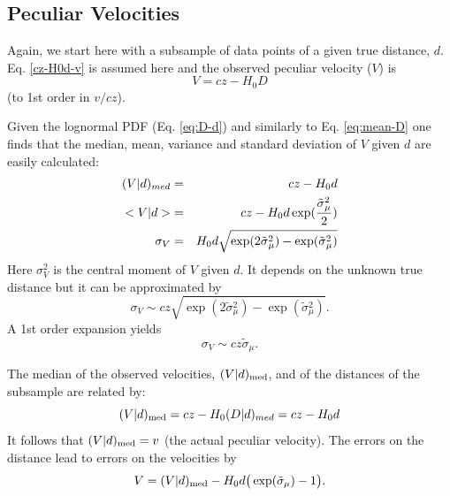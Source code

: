 \documentclass[useAMS,usenatbib]{mn2e}
\begin{document}
\subsection{  Peculiar  Velocities}%
\label{subsec:BGc-v}
 
 Again, we start here with  a  subsample of data points of  a given true distance, $d$. Eq. \ref{cz-H0d-v} is assumed here and  the   observed  peculiar  velocity ($V$) is
\begin{equation}
V =  cz -H_0 D
\label{V-cz-H0-D}
\end{equation}
(to 1st order in $v/cz$).


Given the lognormal PDF  (Eq. \ref{eq:D-d}) and similarly to Eq. \ref{eq:mean-D} one finds that the median, mean, variance and standard deviation of $V$   given $d$ are easily calculated: 
\begin{eqnarray}
(V|d)_{med} & = & cz - H_0 d  \nonumber\\
< V|d > & = &  cz - H_0 d \exp({\tilde{\sigma}{^2_\mu}\over 2} ) \\
\sigma_V & = & H_0d \sqrt{\exp(2\tilde{\sigma}{^2_\mu} )  - \exp(\tilde{\sigma}{^2_\mu}) }  \nonumber
\label{eq:mean-V}
\end{eqnarray}
Here $\sigma{^2_V}$ is the central moment of  $V$ given $d$.
It depends on the unknown true distance but  it can be approximated by
\begin{equation}
\sigma_V \sim cz\sqrt{\exp(2\tilde{\sigma}{^2_\mu} )  - \exp(\tilde{\sigma}{^2_\mu}) }.
\label{eq:mean-cz-V}
\end{equation}
A 1st order expansion yields
\begin{equation}
\sigma_V \sim  cz \tilde{\sigma}_\mu.
\label{eq:sigma-cz-V}
\end{equation}


The median of the observed velocities, $(V|d)_{\rm med}$, and of the distances of the  subsample are related by:
\begin{equation} 
(V|d)_{\rm med}=cz-H_0 (D|d)_{med}=cz-H_0 d
\label{eq:Vmed-v}
 \end{equation}
It follows that  $(V|d)_{\rm med} =v$ (the actual peculiar  velocity).
The errors on the distance lead to errors on the velocities by
\begin{equation}
V=(V|d)_{\rm med}-H_0 d\big(\exp(\tilde{\sigma}_\mu)-1\big).
\label{eq:Vmed-d-err}
\end{equation}
\end{document}
